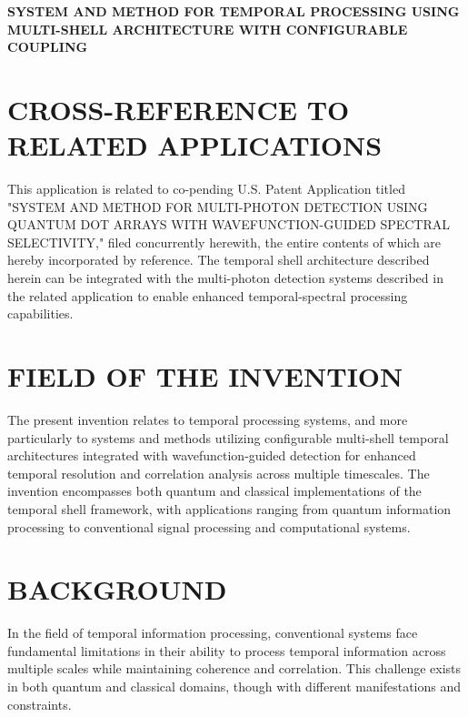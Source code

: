 \documentclass[12pt,letterpaper]{article}
\begin{document}
\begin{center}
\Large\bfseries
SYSTEM AND METHOD FOR TEMPORAL PROCESSING USING MULTI-SHELL ARCHITECTURE WITH CONFIGURABLE COUPLING
\end{center}

\vspace{0.5in}

\vspace{1in}

\section*{CROSS-REFERENCE TO RELATED APPLICATIONS}

This application is related to co-pending U.S. Patent Application titled "SYSTEM AND METHOD FOR MULTI-PHOTON DETECTION USING QUANTUM DOT ARRAYS WITH WAVEFUNCTION-GUIDED SPECTRAL SELECTIVITY," filed concurrently herewith, the entire contents of which are hereby incorporated by reference. The temporal shell architecture described herein can be integrated with the multi-photon detection systems described in the related application to enable enhanced temporal-spectral processing capabilities.

\section*{FIELD OF THE INVENTION}

The present invention relates to temporal processing systems, and more particularly to systems and methods utilizing configurable multi-shell temporal architectures integrated with wavefunction-guided detection for enhanced temporal resolution and correlation analysis across multiple timescales. The invention encompasses both quantum and classical implementations of the temporal shell framework, with applications ranging from quantum information processing to conventional signal processing and computational systems.

\section*{BACKGROUND}

In the field of temporal information processing, conventional systems face fundamental limitations in their ability to process temporal information across multiple scales while maintaining coherence and correlation. This challenge exists in both quantum and classical domains, though with different manifestations and constraints.
\end{document}
